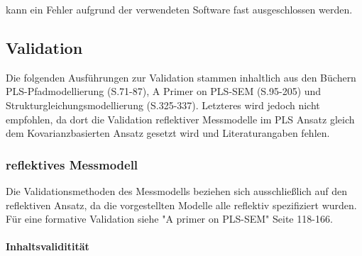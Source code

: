 \documentclass{article}\usepackage[]{graphicx}\usepackage[]{color}
\begin{document}
\pagebreak

kann ein Fehler aufgrund der verwendeten Software fast ausgeschlossen werden.

\newpage

\subsection{Validation}
Die folgenden Ausführungen zur Validation stammen inhaltlich aus den Büchern PLS-Pfadmodellierung (S.71-87)\cite{bliemel2005handbuch}, A Primer on PLS-SEM (S.95-205)\cite{hair2013primer} und Strukturgleichungsmodellierung (S.325-337).\cite{weiber2010strukturgleichungsmodellierung} Letzteres wird jedoch nicht empfohlen, da dort die Validation reflektiver Messmodelle im PLS Ansatz gleich dem Kovarianzbasierten Ansatz gesetzt wird und Literaturangaben fehlen.
\subsubsection{reflektives Messmodell}
Die Validationsmethoden des Messmodells beziehen sich ausschließlich auf den reflektiven Ansatz, da die vorgestellten Modelle alle reflektiv spezifiziert wurden. Für eine formative Validation siehe "A primer on PLS-SEM"\cite{hair2013primer} Seite 118-166.\\

\paragraph{Inhaltsvaliditität} 
\end{document}
